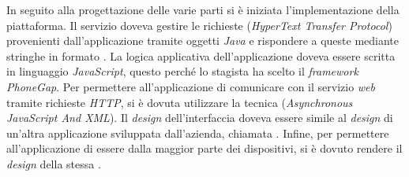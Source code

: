 In seguito alla progettazione delle varie parti si è iniziata l'implementazione della piattaforma. Il servizio doveva gestire le richieste  (\textit{HyperText Transfer Protocol}) provenienti dall'applicazione tramite oggetti  \textit{Java} e rispondere a queste mediante stringhe in formato .
La logica applicativa dell'applicazione doveva essere scritta in linguaggio \textit{JavaScript}, questo perché lo stagista ha scelto il \textit{framework PhoneGap}. Per permettere all'applicazione di comunicare con il servizio \textit{web} tramite richieste \textit{HTTP}, si è dovuta utilizzare la tecnica  (\textit{Asynchronous JavaScript And XML}).
Il \textit{design} dell'interfaccia doveva essere simile al \textit{design} di un'altra applicazione sviluppata dall'azienda, chiamata . Infine, per permettere all'applicazione di essere  dalla maggior parte dei dispositivi, si è dovuto rendere il \textit{design} della stessa .

%
%

\endgroup			

\vfill

